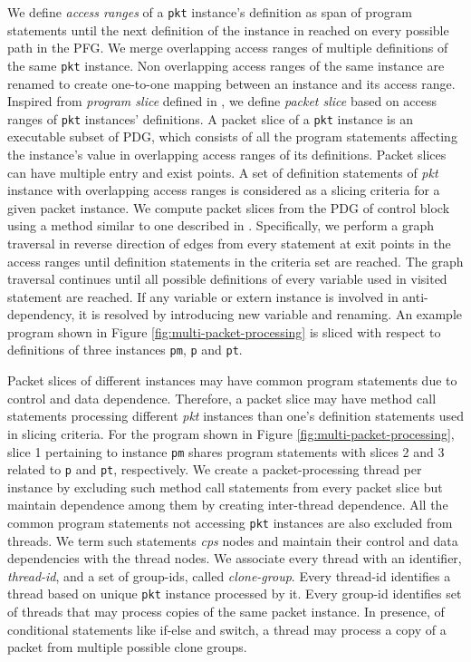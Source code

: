 \documentclass[letterpaper,twocolumn,10pt]{article}
\begin{document}
We define \emph{access ranges} of a \texttt{pkt} instance's definition as span of program statements until the next definition of the instance in reached on every possible path in the PFG.
We merge overlapping access ranges of multiple definitions of the same \texttt{pkt} instance.
Non overlapping access ranges of the same instance are renamed to create one-to-one mapping between an instance and its access range.
Inspired from \emph{program slice} defined in \cite{Weiser:1981:PS:800078.802557}, we define \emph{packet slice} based on access ranges of \texttt{pkt} instances' definitions.
A packet slice of a \texttt{pkt} instance is an executable subset of PDG, which consists of all the program statements affecting the instance's value in overlapping access ranges of its definitions.
Packet slices can have multiple entry and exist points.
A set of definition statements of \emph{pkt} instance with overlapping access ranges is considered as a slicing criteria for a given packet instance.
We compute packet slices from the PDG of control block using a method similar to one described in \cite{Ferrante:1987:PDG:24039.24041}.
Specifically, we perform a graph traversal in reverse direction of edges from every statement at exit points in the access ranges until definition statements in the criteria set are reached.
The graph traversal continues until all possible definitions of every variable used in visited statement are reached.
If any variable or extern instance is involved in anti-dependency, it is resolved by introducing new variable and renaming.
An example program shown in Figure \ref{fig:multi-packet-processing} is sliced with respect to definitions of three instances \texttt{pm}, \texttt{p} and \texttt{pt}.


Packet slices of different instances may have common program statements due to control and data dependence.
Therefore, a packet slice may have method call statements processing different \emph{pkt} instances than one's definition statements used in slicing criteria.
For the program shown in Figure \ref{fig:multi-packet-processing}, slice 1 pertaining to instance \texttt{pm} shares program statements with slices 2 and 3 related to \texttt{p} and \texttt{pt}, respectively.
We create a packet-processing thread per instance by excluding such method call statements from every packet slice but maintain dependence among them by creating inter-thread dependence.
All the common program statements not accessing \texttt{pkt} instances are also excluded from threads.
We term such statements \emph{cps} nodes and maintain their control and data dependencies with the thread nodes.
We associate every thread with an identifier, \emph{thread-id}, and a set of group-ids, called \emph{clone-group}.
Every thread-id identifies a thread based on unique \texttt{pkt} instance processed by it.
Every group-id identifies set of threads that may process copies of the same packet instance.
In presence, of conditional statements like if-else and switch, a thread may process a copy of a packet from multiple possible clone groups.
\end{document}
